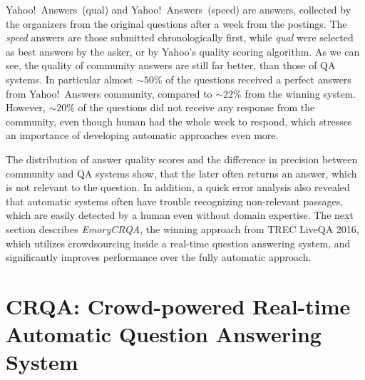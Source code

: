 Yahoo!~Answers~(qual) and Yahoo!~Answers~(speed) are answers, collected by the organizers from the original questions after a week from the postings.
The \textit{speed} answers are those submitted chronologically first, while \textit{qual} were selected as best answers by the asker, or by Yahoo's quality scoring algorithm.
As we can see, the quality of community answers are still far better, than those of QA systems.
In particular almost $\sim 50\%$ of the questions received a perfect answers from Yahoo!~Answers community, compared to $\sim 22\%$ from the winning system.
However, $\sim 20\%$ of the questions did not receive any response from the community, even though human had the whole week to respond, which stresses an importance of developing automatic approaches even more.

The distribution of answer quality scores and the difference in precision between community and QA systems show, that the later often returns an answer, which is not relevant to the question.
In addition, a quick error analysis also revealed that automatic systems often have trouble recognizing non-relevant passages, which are easily detected by a human even without domain expertise.
The next section describes \textit{EmoryCRQA}, the winning approach from TREC LiveQA 2016, which utilizes crowdsourcing inside a real-time question answering system, and significantly improves performance over the fully automatic approach.







\section{CRQA: Crowd-powered Real-time Automatic Question Answering System}
\label{section:non-factoid:crowdsourcing}

